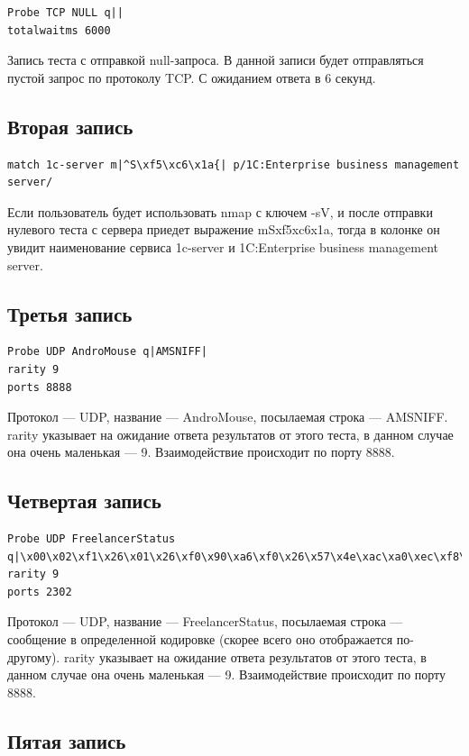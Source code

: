 \documentclass[utf8x, 12pt]{G7-32}
\begin{document}
\begin{lstlisting}
Probe TCP NULL q||
totalwaitms 6000
\end{lstlisting}

Запись теста с отправкой null-запроса. В данной записи будет отправляться пустой запрос по протоколу TCP. С ожиданием ответа в 6 секунд.

\subsection{Вторая запись}

\begin{lstlisting}
match 1c-server m|^S\xf5\xc6\x1a{| p/1C:Enterprise business management server/
\end{lstlisting}

 Если пользователь будет использовать nmap с ключем -sV, и после отправки
  нулевого теста с сервера приедет выражение mSxf5xc6x1a, тогда в колонке  он увидит наименование сервиса 1c-server и 1C:Enterprise business management server.


\subsection{Третья запись}
\begin{lstlisting}
Probe UDP AndroMouse q|AMSNIFF|
rarity 9
ports 8888
\end{lstlisting}

Протокол --- UDP, название --- AndroMouse, посылаемая строка --- AMSNIFF.
rarity указывает на ожидание ответа результатов от этого теста, в данном случае она очень маленькая --- 9. Взаимодействие происходит по порту 8888.

\subsection{Четвертая запись}
\begin{lstlisting}
Probe UDP FreelancerStatus q|\x00\x02\xf1\x26\x01\x26\xf0\x90\xa6\xf0\x26\x57\x4e\xac\xa0\xec\xf8\x68\xe4\x8d\x21|
rarity 9
ports 2302
\end{lstlisting}

Протокол --- UDP, название --- FreelancerStatus, посылаемая строка --- сообщение в определенной кодировке (скорее всего оно отображается по-другому).
rarity указывает на ожидание ответа результатов от этого теста, в данном случае она очень маленькая --- 9. Взаимодействие происходит по порту 8888.

\subsection{Пятая запись}
\end{document}
